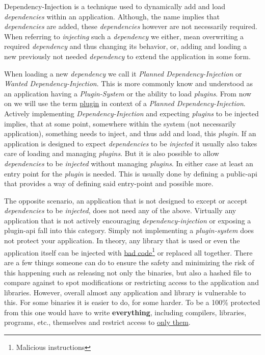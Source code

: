 Dependency-Injection is a technique used to dynamically add and load \textit{dependencies} within an application.
Although, the name implies that \textit{dependencies} are added, these \textit{dependencies} however are not necessarily required.
When referring to \textit{injecting} such a \textit{dependency} we either, mean overwriting a required \textit{dependency} and thus changing its behavior, or, adding and loading a new previously not needed \textit{dependency} to extend the application in some form.

When loading a new \textit{dependency} we call it \textit{Planned Dependency-Injection} or \textit{Wanted Dependency-Injection}.
This is more commonly know and understood as an application having a \textit{Plugin-System} or the ability to load \textit{plugins}.
From now on we will use the term \underline{plugin} in context of a \textit{Planned Dependency-Injection}.
Actively implementing \textit{Dependency-Injection} and expecting \textit{plugins} to be injected implies, that at some point, somewhere within the system (not necessarily application), something needs to inject, and thus add and load, this \textit{plugin}.
If an application is designed to expect \textit{dependencies} to be \textit{injected} it usually also takes care of loading and managing \textit{plugins}.
But it is also possible to allow \textit{dependencies} to be \textit{injected} without managing \textit{plugins}.
In either case at least an entry point for the \textit{plugin} is needed. 
This is usually done by defining a public-api that provides a way of defining said entry-point and possible more.

The opposite scenario, an application that is not designed to except or accept \textit{dependencies} to be \textit{injected}, does not need any of the above.
Virtually any application that is not actively encouraging \textit{dependency-injection} or exposing a plugin-api fall into this category.
Simply not implementing a \textit{plugin-system} does not protect your application.
In theory, any library that is used or even the application itself can be injected with \underline{bad code}\footnote{Malicious instructions} or replaced all together.
There are a few things someone can do to ensure the safety and minimizing the risk of this happening such as releasing not only the binaries, but also a hashed file to compare against to spot modifications or restricting access to the application and libraries.
However, overall almost any application and library is vulnerable to this.
For some binaries it is easier to do, for some harder.
To be a 100\% protected from this one would have to write \textbf{everything}, including compilers, libraries, programs, etc., themselves and restrict access to \underline{only them}.

